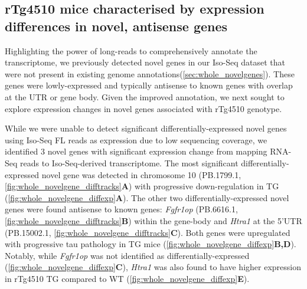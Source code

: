 \clearpage
\subsection{rTg4510 mice characterised by expression differences in novel, antisense genes}
Highlighting the power of long-reads to comprehensively annotate the transcriptome, we previously detected novel genes in our Iso-Seq dataset that were not present in existing genome annotations(\cref{sec:whole_novelgenes}). These genes were lowly-expressed and typically antisense to known genes with overlap at the UTR or gene body. Given the improved annotation, we next sought to explore expression changes in novel genes associated with rTg4510 genotype. 

While we were unable to detect significant differentially-expressed novel genes using Iso-Seq FL reads as expression due to low sequencing coverage, we identified 3 novel genes with significant expression change from mapping RNA-Seq reads to Iso-Seq-derived transcriptome. The most significant differentially-expressed novel gene was detected in chromosome 10 (PB.1799.1, \cref{fig:whole_novelgene_difftracks}\textbf{A}) with progressive down-regulation in TG (\cref{fig:whole_novelgene_diffexp}\textbf{A}). The other two differentially-expressed novel genes were found antisense to known genes: \textit{Fgfr1op} (PB.6616.1, \cref{fig:whole_novelgene_difftracks}\textbf{B}) within the gene-body and \textit{Htra1} at the 5'UTR (PB.15002.1, \cref{fig:whole_novelgene_difftracks}\textbf{C}). Both genes were upregulated with progressive tau pathology in TG mice (\cref{fig:whole_novelgene_diffexp}\textbf{B,D}). Notably, while \textit{Fgfr1op} was not identified as differentially-expressed (\cref{fig:whole_novelgene_diffexp}\textbf{C}), \textit{Htra1} was also found to have higher expression in rTg4510 TG compared to WT (\cref{fig:whole_novelgene_diffexp}\textbf{E}).     

